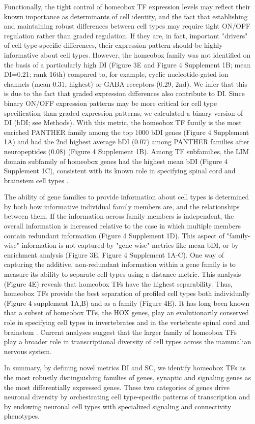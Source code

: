 Functionally, the tight control of homeobox TF expression levels may reflect their known importance as determinants of cell identity, and the fact that establishing and maintaining robust differences between cell types may require tight ON/OFF regulation rather than graded regulation. If they are, in fact, important "drivers" of cell type-specific differences, their expression pattern should be highly informative about cell types. However, the homeobox family was not identified on the basis of a particularly high DI (Figure 3E and Figure 4 Supplement 1B; mean DI=0.21; rank 16th) compared to, for example, cyclic nucleotide-gated ion channels (mean 0.31, highest) or GABA receptors (0.29, 2nd). We infer that this is due to the fact that graded expression differences also contribute to DI. Since binary ON/OFF expression patterns may be more critical for cell type specification than graded expression patterns, we calculated a binary version of DI (bDI; see Methods). With this metric, the homeobox TF family is the most enriched PANTHER family among the top 1000 bDI genes (Figure 4 Supplement 1A) and had the 2nd highest average bDI (0.07) among PANTHER families after neuropeptides (0.08) (Figure 4 Supplement 1B). Among TF subfamilies, the LIM domain subfamily of homeobox genes had the highest mean bDI (Figure 4 Supplement 1C), consistent with its known role in specifying spinal cord and brainstem cell types \citep{Dasen_2009,Philippidou_2013}. 

The ability of gene families to provide information about cell types is determined by both how informative individual family members are, and the relationships between them. If the information across family members is independent, the overall information is increased relative to the case in which multiple members contain redundant information (Figure 4 Supplement 1D). This aspect of "family-wise" information is not captured by "gene-wise" metrics like mean bDI, or by enrichment analysis (Figure 3E, Figure 4 Supplement 1A-C). One way of capturing the additive, non-redundant information within a gene family is to measure its ability to separate cell types using a distance metric. This analysis (Figure 4E) reveals that homeobox TFs have the highest separability. Thus, homeobox TFs provide the best separation of profiled cell types both individually (Figure 4 supplement 1A,B) and as a family (Figure 4E). It has long been known that a subset of homeobox TFs, the HOX genes, play an evolutionarily conserved role in specifying cell types in invertebrates \citep{Kratsios_2017,Zheng_2015} and in the vertebrate spinal cord and brainstem \citep{Dasen_2009,Philippidou_2013}. Current analyses suggest that the larger family of homeobox TFs play a broader role in transcriptional diversity of cell types across the mammalian nervous system.

In summary, by defining novel metrics DI and SC, we identify homeobox TFs as the most robustly distinguishing families of genes, synaptic and signaling genes as the most differentially expressed genes. These two categories of genes drive neuronal diversity by orchestrating cell type-specific patterns of transcription and by endowing neuronal cell types with specialized signaling and connectivity phenotypes.



